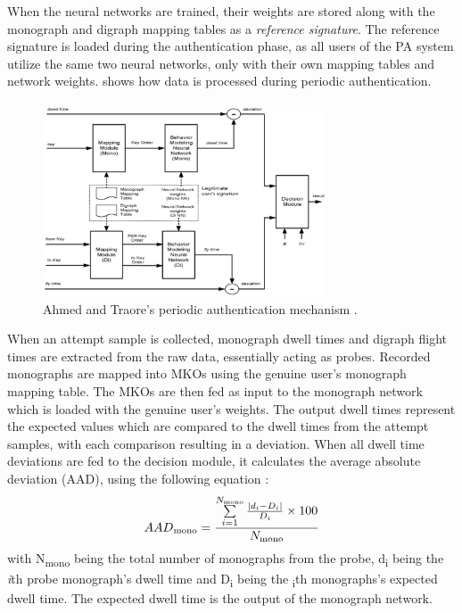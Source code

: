 \documentclass[informationsecurity]{gucmasterproject}
\begin{document}
When the neural networks are trained, their weights are stored along with the monograph and digraph mapping tables as a \textit{reference signature}.
The reference signature is loaded during the authentication phase, as all users of the PA system utilize the same two neural networks, only with their own mapping tables and network weights.
 shows how data is processed during periodic authentication.
\begin{figure}[h]
    \centering
    \includegraphics[width=0.75\textwidth]{ahmed/authentication}
    \caption{Ahmed and Traore's periodic authentication mechanism \cite{Ahmed}.}
    \label{fig:ahmed-authentication}
\end{figure}
When an attempt sample is collected, monograph dwell times and digraph flight times are extracted from the raw data, essentially acting as probes.
Recorded monographs are mapped into MKOs using the genuine user's monograph mapping table.
The MKOs are then fed as input to the monograph network which is loaded with the genuine user's weights.
The output dwell times represent the expected values which are compared to the dwell times from the attempt samples, with each comparison resulting in a deviation.
When all dwell time deviations are fed to the decision module, it calculates the average absolute deviation (AAD), using the following equation \cite{Ahmed}:
\begin{equation}
AAD\textsubscript{mono}={{\sum\limits_{i=1}^{N_{\rm mono}}{{{\left\vert{d_{i}-D_{i}}\right\vert}\over{D_{i}}}\times100}}\over{N_{\rm mono}}}
\end{equation}
with N\textsubscript{mono} being the total number of monographs from the probe, d\textsubscript{i} being the \textit{i}th probe monograph's dwell time and D\textsubscript{i} being the \textsubscript{i}th monographs's expected dwell time.
The expected dwell time is the output of the monograph network.
\end{document}
